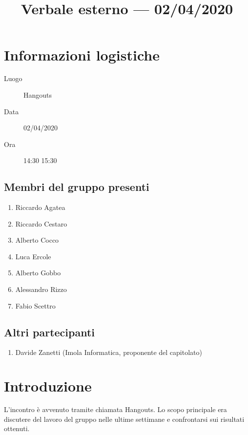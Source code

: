 \documentclass{article}
\title{Verbale esterno --- 02/04/2020}
\begin{document}


\section{Informazioni logistiche}%
\label{sec:informazioni_logistiche}

\begin{description}
  \item [Luogo] Hangouts
  \item [Data] 02/04/2020
  \item [Ora] 14:30  15:30
\end{description}

\subsection{Membri del gruppo presenti}%
\label{sub:membri_del_gruppo_presenti}

\begin{enumerate}
  \item Riccardo Agatea
  \item Riccardo Cestaro
  \item Alberto Cocco
  \item Luca Ercole
  \item Alberto Gobbo
  \item Alessandro Rizzo
  \item Fabio Scettro
\end{enumerate}


\subsection{Altri partecipanti}%
\label{sub:altri_partecipanti}

\begin{enumerate}
  \item Davide Zanetti (Imola Informatica, proponente del capitolato)
\end{enumerate}


\section{Introduzione}%
\label{sec:introduzione}
L'incontro è avvenuto tramite chiamata Hangouts.
Lo scopo principale era discutere del lavoro del gruppo nelle ultime settimane e confrontarsi sui risultati ottenuti.
\end{document}
